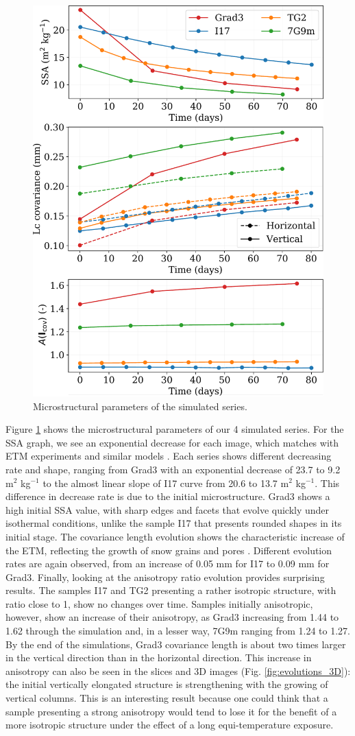 \documentclass[draft,ms]{agujournal2019}
\begin{document}
\begin{figure}
    \centering
    \includegraphics[width=0.6\linewidth]{Figures/4_images_microstructure.pdf}
    \caption{Microstructural parameters of the simulated series.}
    \label{fig:4_images_microstruct}
\end{figure}
Figure \ref{fig:4_images_microstruct} shows the microstructural parameters of our 4 simulated series. For the SSA graph, we see an exponential decrease for each image, which matches with ETM experiments and similar models \cite{vetter_simulating_2010, kaempfer_observation_2007}. Each series shows different decreasing rate and shape, ranging from Grad3 with an exponential decrease of 23.7 to 9.2 m$^2$ kg$^{-1}$ to the almost linear slope of I17 curve from 20.6 to 13.7 m$^2$ kg$^{-1}$. This difference in decrease rate  is due to the initial microstructure. Grad3 shows a high initial SSA value, with sharp edges and facets that evolve quickly under isothermal conditions, unlike the sample I17 that presents rounded shapes in its initial stage.
The covariance length evolution shows the characteristic increase of the ETM, reflecting the growth of snow grains and pores \cite{lowe2011interfacial, calonne_study_2014}. Different evolution rates are again observed, from an increase of 0.05 mm for I17 to 0.09 mm for Grad3. Finally, looking at the anisotropy ratio evolution provides surprising results. The samples I17 and TG2 presenting a rather isotropic structure, with ratio close to 1, show no changes over time. Samples initially anisotropic, however, show an increase of their anisotropy, as Grad3 increasing from 1.44 to 1.62 through the simulation and, in a lesser way, 7G9m ranging from 1.24 to 1.27. By the end of the simulations, Grad3 covariance length is about two times larger in the vertical direction than in the horizontal direction. This increase in anisotropy can also be seen in the slices and 3D images (Fig. \ref{fig:evolutions_3D}): the initial vertically elongated structure is strengthening with the growing of vertical columns. This is an interesting result because one could think that a sample presenting a strong anisotropy would tend to lose it for the benefit of a more isotropic structure under the effect of a long equi-temperature exposure.
\end{document}
